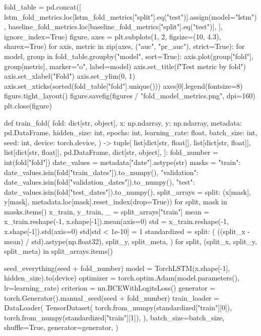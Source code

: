 \documentclass[UTF8,a4paper,fontset=fandol]{ctexart}
\begin{document}
\begin{ProjectCode}
{{    fold_table = pd.concat([
        lstm_fold_metrics.loc[lstm_fold_metrics["split"].eq("test")].assign(model="lstm"),
        baseline_fold_metrics.loc[baseline_fold_metrics["split"].eq("test")],
    ], ignore_index=True)
    figure, axes = plt.subplots(1, 2, figsize=(10, 4.3), sharex=True)
    for axis, metric in zip(axes, ("auc", "pr_auc"), strict=True):
        for model, group in fold_table.groupby("model", sort=True):
            axis.plot(group["fold"], group[metric], marker="o", label=model)
        axis.set_title(f"Test {metric} by fold")
        axis.set_xlabel("Fold")
        axis.set_ylim(0, 1)
        axis.set_xticks(sorted(fold_table["fold"].unique()))
    axes[0].legend(fontsize=8)
    figure.tight_layout()
    figure.savefig(figures / "fold_model_metrics.png", dpi=160)
    plt.close(figure)


def train_fold(
    fold: dict[str, object],
    x: np.ndarray,
    y: np.ndarray,
    metadata: pd.DataFrame,
    hidden_size: int,
    epochs: int,
    learning_rate: float,
    batch_size: int,
    seed: int,
    device: torch.device,
) -> tuple[
    list[dict[str, float]],
    list[dict[str, float]],
    list[dict[str, float]],
    pd.DataFrame,
    dict[str, object],
]:
    fold_number = int(fold["fold"])
    date_values = metadata["date"].astype(str)
    masks = {
        "train": date_values.isin(fold["train_dates"]).to_numpy(),
        "validation": date_values.isin(fold["validation_dates"]).to_numpy(),
        "test": date_values.isin(fold["test_dates"]).to_numpy(),
    }
    split_arrays = {
        split: (x[mask], y[mask], metadata.loc[mask].reset_index(drop=True))
        for split, mask in masks.items()
    }
    x_train, y_train, _ = split_arrays["train"]
    mean = x_train.reshape(-1, x.shape[-1]).mean(axis=0)
    std = x_train.reshape(-1, x.shape[-1]).std(axis=0)
    std[std < 1e-10] = 1
    standardized = {
        split: (
            ((split_x - mean) / std).astype(np.float32),
            split_y,
            split_meta,
        )
        for split, (split_x, split_y, split_meta) in split_arrays.items()
    }

    seed_everything(seed + fold_number)
    model = TorchLSTM(x.shape[-1], hidden_size).to(device)
    optimizer = torch.optim.Adam(model.parameters(), lr=learning_rate)
    criterion = nn.BCEWithLogitsLoss()
    generator = torch.Generator().manual_seed(seed + fold_number)
    train_loader = DataLoader(
        TensorDataset(
            torch.from_numpy(standardized["train"][0]),
            torch.from_numpy(standardized["train"][1]),
        ),
        batch_size=batch_size,
        shuffle=True,
        generator=generator,
    )

}}
\end{ProjectCode}
\end{document}
